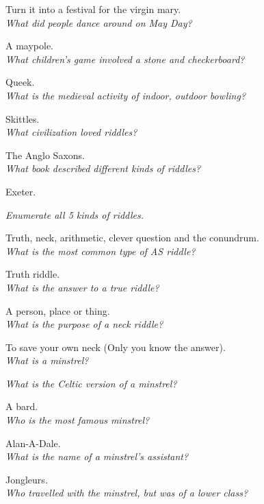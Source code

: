 \documentclass[12pt]{article}
\begin{document}
Turn it into a festival for the virgin mary.\\

\textit{What did people dance around on May Day?}

A maypole.\\

\textit{What children's game involved a stone and checkerboard?}

Queek.\\

\textit{What is the medieval activity of indoor, outdoor bowling?}

Skittles.\\

\textit{What civilization loved riddles?}

The Anglo Saxons.\\

\textit{What book described different  kinds of riddles?}

Exeter.

\textit{Enumerate all 5 kinds of riddles.}

Truth, neck, arithmetic, clever question and the conundrum.\\

\textit{What is the most common type of AS riddle?}

Truth riddle.\\

\textit{What is the answer to a true riddle?}

A person, place or thing.\\

\textit{What is the purpose of a neck riddle?}

To save your own neck (Only you know the answer).\\

\textit{What is a minstrel?}


\textit{What is the Celtic version of a minstrel?}

A bard.\\ 

\textit{Who is the most famous minstrel?}

Alan-A-Dale.\\

\textit{What is the name of a minstrel's assistant?}

Jongleurs.\\


\textit{Who travelled with the minstrel, but was of a lower class?}
\end{document}
